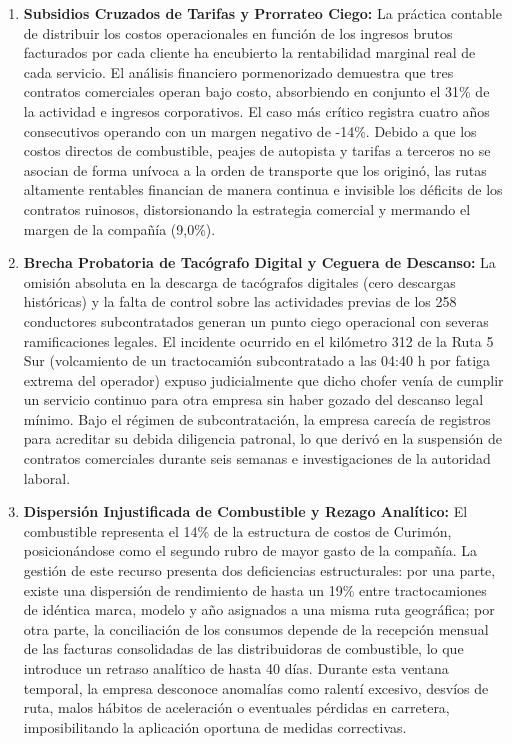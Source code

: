 \begin{enumerate}
  \item \textbf{Subsidios Cruzados de Tarifas y Prorrateo Ciego:} La práctica contable de distribuir los costos operacionales en función de los ingresos brutos facturados por cada cliente ha encubierto la rentabilidad marginal real de cada servicio. El análisis financiero pormenorizado demuestra que tres contratos comerciales operan bajo costo, absorbiendo en conjunto el 31\% de la actividad e ingresos corporativos. El caso más crítico registra cuatro años consecutivos operando con un margen negativo de -14\%. Debido a que los costos directos de combustible, peajes de autopista y tarifas a terceros no se asocian de forma unívoca a la orden de transporte que los originó, las rutas altamente rentables financian de manera continua e invisible los déficits de los contratos ruinosos, distorsionando la estrategia comercial y mermando el margen de la compañía (9,0\%).
  \item \textbf{Brecha Probatoria de Tacógrafo Digital y Ceguera de Descanso:} La omisión absoluta en la descarga de tacógrafos digitales (cero descargas históricas) y la falta de control sobre las actividades previas de los 258 conductores subcontratados generan un punto ciego operacional con severas ramificaciones legales. El incidente ocurrido en el kilómetro 312 de la Ruta 5 Sur (volcamiento de un tractocamión subcontratado a las 04:40 h por fatiga extrema del operador) expuso judicialmente que dicho chofer venía de cumplir un servicio continuo para otra empresa sin haber gozado del descanso legal mínimo. Bajo el régimen de subcontratación, la empresa carecía de registros para acreditar su debida diligencia patronal, lo que derivó en la suspensión de contratos comerciales durante seis semanas e investigaciones de la autoridad laboral.
  \item \textbf{Dispersión Injustificada de Combustible y Rezago Analítico:} El combustible representa el 14\% de la estructura de costos de Curimón, posicionándose como el segundo rubro de mayor gasto de la compañía. La gestión de este recurso presenta dos deficiencias estructurales: por una parte, existe una dispersión de rendimiento de hasta un 19\% entre tractocamiones de idéntica marca, modelo y año asignados a una misma ruta geográfica; por otra parte, la conciliación de los consumos depende de la recepción mensual de las facturas consolidadas de las distribuidoras de combustible, lo que introduce un retraso analítico de hasta 40 días. Durante esta ventana temporal, la empresa desconoce anomalías como ralentí excesivo, desvíos de ruta, malos hábitos de aceleración o eventuales pérdidas en carretera, imposibilitando la aplicación oportuna de medidas correctivas.

\end{enumerate}
